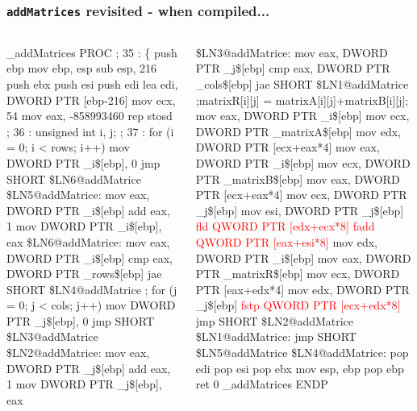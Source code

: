 \documentclass[smaller,handout,table]{beamer}
\begin{document}
\begin{frame}[fragile]
\frametitle{{\tt addMatrices} revisited - when compiled...}
\begin{columns}
\begin{column}{5cm}
\vspace{-0.2in}
\begin{semiverbatim}
\tiny
\_addMatrices PROC
; 35   : \{
        push    ebp
        mov     ebp, esp
        sub     esp, 216
        push    ebx
        push    esi
        push    edi
        lea     edi, DWORD PTR [ebp-216]
        mov     ecx, 54
        mov     eax, -858993460
        rep stosd
; 36   :        unsigned int i, j;
; 37   :        for (i = 0; i < rows; i++)
        mov     DWORD PTR \_i\$[ebp], 0
        jmp     SHORT \$LN6@addMatrice
\$LN5@addMatrice:
        mov     eax, DWORD PTR \_i\$[ebp]
        add     eax, 1
        mov     DWORD PTR \_i\$[ebp], eax
\$LN6@addMatrice:
        mov     eax, DWORD PTR \_i\$[ebp]
        cmp     eax, DWORD PTR \_rows\$[ebp]
        jae     SHORT \$LN4@addMatrice
; for (j = 0; j < cols; j++)
        mov     DWORD PTR \_j\$[ebp], 0
        jmp     SHORT \$LN3@addMatrice
\$LN2@addMatrice:
        mov     eax, DWORD PTR \_j\$[ebp]
        add     eax, 1
        mov     DWORD PTR \_j\$[ebp], eax
\end{semiverbatim}
\end{column}
\begin{column}{5cm}
\vspace{-0.2in}
\begin{semiverbatim}
\tiny
\$LN3@addMatrice:
        mov     eax, DWORD PTR \_j\$[ebp]
        cmp     eax, DWORD PTR \_cols\$[ebp]
        jae     SHORT \$LN1@addMatrice
;matrixR[i][j] = matrixA[i][j]+matrixB[i][j];
        mov     eax, DWORD PTR \_i\$[ebp]
        mov     ecx, DWORD PTR \_matrixA\$[ebp]
        mov     edx, DWORD PTR [ecx+eax*4]
        mov     eax, DWORD PTR \_i\$[ebp]
        mov     ecx, DWORD PTR \_matrixB\$[ebp]
        mov     eax, DWORD PTR [ecx+eax*4]
        mov     ecx, DWORD PTR \_j\$[ebp]
        mov     esi, DWORD PTR \_j\$[ebp]
\textcolor{red}{        fld     QWORD PTR [edx+ecx*8]}
\textcolor{red}{        fadd    QWORD PTR [eax+esi*8]}
        mov     edx, DWORD PTR \_i\$[ebp]
        mov     eax, DWORD PTR \_matrixR\$[ebp]
        mov     ecx, DWORD PTR [eax+edx*4]
        mov     edx, DWORD PTR \_j\$[ebp]
\textcolor{red}{        fstp    QWORD PTR [ecx+edx*8]}
        jmp     SHORT \$LN2@addMatrice
\$LN1@addMatrice:
        jmp     SHORT \$LN5@addMatrice
\$LN4@addMatrice:
        pop     edi
        pop     esi
        pop     ebx
        mov     esp, ebp
        pop     ebp
        ret     0
\_addMatrices ENDP
\end{semiverbatim}
\end{column}
\end{columns}
\end{frame}
\end{document}
